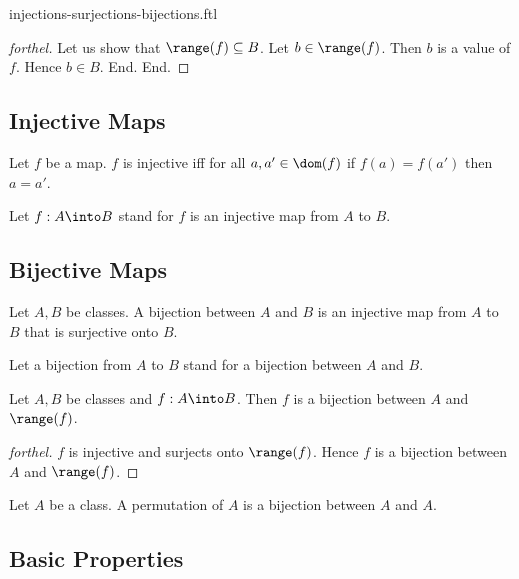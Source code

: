 \documentclass{naproche-library}
\begin{document}
\begin{smodule}{injections-surjections-bijections.ftl}
\begin{proof}[forthel]
      Let us show that $\range(f) \subseteq B$.
        Let $b \in \range(f)$.
        Then $b$ is a value of $f$.
        Hence $b \in B$.
      End.
    End.
  \end{proof}


  \subsection*{Injective Maps}

  \begin{definition}[forthel,id=FOUNDATIONS_08_605931408719872,printid]
    Let $f$ be a map.
    $f$ is injective iff for all $a, a' \in \dom(f)$ if $f(a) = f(a')$ then $a = a'$.

    Let $f: A \into B$ stand for $f$ is an injective map from $A$ to $B$.
  \end{definition}


  \subsection*{Bijective Maps}

  \begin{definition}[forthel,id=FOUNDATIONS_08_3356670992318464,printid]
    Let $A, B$ be classes.
    A bijection between $A$ and $B$ is an injective map from $A$ to $B$ that is surjective onto $B$.

    Let a bijection from $A$ to $B$ stand for a bijection between $A$ and $B$.
  \end{definition}

  \begin{proposition}[forthel,id=FOUNDATIONS_08_60881194975232,printid]
    Let $A, B$ be classes and $f : A \into B$.
    Then $f$ is a bijection between $A$ and $\range(f)$.
  \end{proposition}
  \begin{proof}[forthel]
    $f$ is injective and surjects onto $\range(f)$.
    Hence $f$ is a bijection between $A$ and $\range(f)$.
  \end{proof}

  \begin{definition}[forthel,id=FOUNDATIONS_08_8188451318923264,printid]
    Let $A$ be a class.
    A permutation of $A$ is a bijection between $A$ and $A$.
  \end{definition}


  \subsection*{Basic Properties}


\end{smodule}
\end{document}
